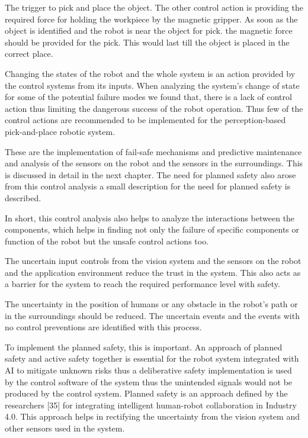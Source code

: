 {The trigger to pick and place the object. The other control action is providing the required force for holding the workpiece by the magnetic gripper. As soon as the object is identified and the robot is near the object for pick. the magnetic force should be provided for the pick. This would last till the object is placed in the correct place.

Changing the states of the robot and the whole system is an action provided by the control systems from its inputs.  When analyzing the system's change of state for some of the potential failure modes we found that, there is a lack of control action thus limiting the dangerous success of the robot operation. Thus few of the control actions are recommended to be implemented for the perception-based pick-and-place robotic system.

These are the implementation of fail-safe mechanisms and predictive maintenance and analysis of the sensors on the robot and the sensors in the surroundings. This is discussed in detail in the next chapter. The need for planned safety also arose from this control analysis a small description for the need for planned safety is described.

In short, this control analysis also helps to analyze the interactions between the components, which helps in finding not only the failure of specific components or function of the robot but the unsafe control actions too.

\vspace{0.5cm}

The uncertain input controls from the vision system and the sensors on the robot and the application environment reduce the trust in the system. This also acts as a barrier for the system to reach the required performance level with safety. 

The uncertainty in the position of humans or any obstacle in the robot's path or in the surroundings should be reduced. The uncertain events and the events with no control preventions are identified with this process.

To implement the planned safety, this is important. An approach of planned safety and active safety together is essential for the robot system integrated with AI to mitigate unknown risks thus a deliberative safety implementation is used by the control software of the system thus the unintended signals would not be produced by the control system.  Planned safety is an approach defined by the researchers [35] for integrating intelligent human-robot collaboration in Industry 4.0. This approach helps in rectifying the uncertainty from the vision system and other sensors used in the system.

}

